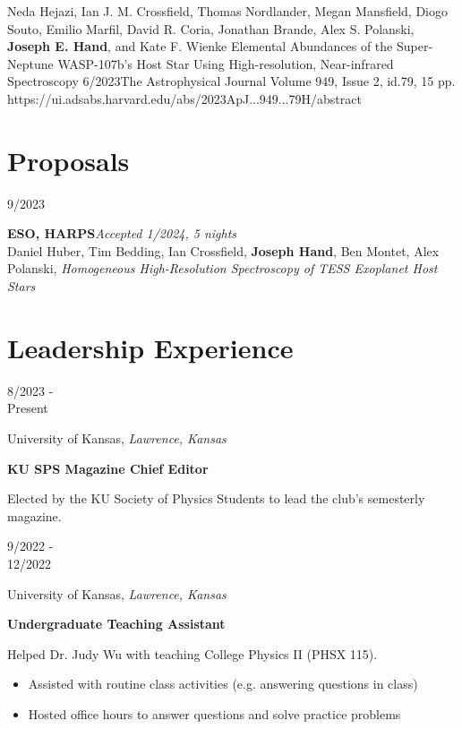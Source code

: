 \documentclass[12pt]{article}
\newenvironment{entry}[4]{
  \medskip
  \begin{minipage}[t]{0.75in}
    #3
  \end{minipage}
  \begin{minipage}[t]{\dimexpr\textwidth-0.75in}
    #1, \textit{#2}

    \textbf{#4}
    
    \smallskip
}{
  \end{minipage}
}
\begin{document}
\publication
{Neda Hejazi, Ian J. M. Crossfield, Thomas Nordlander, Megan Mansfield, Diogo Souto, Emilio Marfil, David R. Coria, Jonathan Brande, Alex S. Polanski, \textbf{Joseph E. Hand}, and Kate F. Wienke}
{Elemental Abundances of the Super-Neptune WASP-107b's Host Star Using High-resolution, Near-infrared Spectroscopy}
{6/2023}{The Astrophysical Journal}{ Volume 949, Issue 2, id.79, 15 pp.}
{https://ui.adsabs.harvard.edu/abs/2023ApJ...949...79H/abstract}

\section*{Proposals}\vspace{-1ex}

\newcommand{\proposal}[5]{
  \medskip
  \begin{minipage}[t]{0.75in}
    #3
  \end{minipage}
  \begin{minipage}[t]{\dimexpr\textwidth-0.75in}
    \textbf{#4}\hfill \textit{#5}\\
    #1, \textit{#2}
  \end{minipage}

}

\proposal{Daniel Huber, Tim Bedding, Ian Crossfield, \textbf{Joseph Hand}, Ben Montet, Alex Polanski}{Homogeneous High-Resolution Spectroscopy of TESS Exoplanet Host Stars}{9/2023}{ESO, HARPS}{Accepted 1/2024, 5 nights}

\section*{Leadership Experience}\vspace{-1ex}

\begin{entry}{University of Kansas}{Lawrence, Kansas}{8/2023 -\\ Present}{KU SPS Magazine Chief Editor}
  Elected by the KU Society of Physics Students to lead the club's
  semesterly magazine.
\end{entry}

\begin{entry}{University of Kansas}{Lawrence, Kansas}{9/2022 -\\ 12/2022}{Undergraduate Teaching Assistant}  
  Helped Dr. Judy Wu with teaching College Physics II (PHSX 115).
  \begin{itemize}
    \item Assisted with routine class activities (e.g. answering questions in class)
    \item Hosted office hours to answer questions and solve practice problems
  \end{itemize}
\end{entry}
\end{document}

